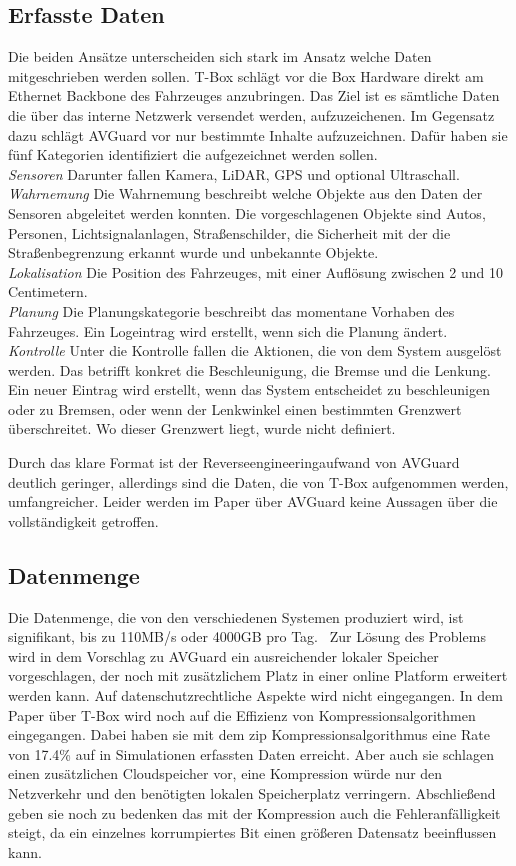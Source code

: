 \documentclass[conference,compsoc,final,a4paper]{IEEEtran}
\begin{document}
\subsection{Erfasste Daten}

Die beiden Ansätze unterscheiden sich stark im Ansatz welche Daten mitgeschrieben werden sollen.
T-Box schlägt vor die Box Hardware direkt am Ethernet Backbone des Fahrzeuges anzubringen.
Das Ziel ist es sämtliche Daten die über das interne Netzwerk versendet werden, aufzuzeichenen.
Im Gegensatz dazu schlägt AVGuard vor nur bestimmte Inhalte aufzuzeichnen.
Dafür haben sie fünf Kategorien identifiziert die aufgezeichnet werden sollen.\\
\emph{Sensoren} Darunter fallen Kamera, \ac{LiDAR}, \ac{GPS} und optional Ultraschall.\\
\emph{Wahrnemung} Die Wahrnemung beschreibt welche Objekte aus den Daten der Sensoren abgeleitet werden konnten.
  Die vorgeschlagenen Objekte sind Autos, Personen, Lichtsignalanlagen, Straßenschilder,
  die Sicherheit mit der die Straßenbegrenzung erkannt wurde und unbekannte Objekte.\\
\emph{Lokalisation} Die Position des Fahrzeuges, mit einer Auflösung zwischen 2 und 10 Centimetern.\\
\emph{Planung} Die Planungskategorie beschreibt das momentane Vorhaben des Fahrzeuges.
  Ein Logeintrag wird erstellt, wenn sich die Planung ändert.\\
\emph{Kontrolle} Unter die Kontrolle fallen die Aktionen, die von dem System ausgelöst werden.
  Das betrifft konkret die Beschleunigung, die Bremse und die Lenkung. 
  Ein neuer Eintrag wird erstellt, wenn das System entscheidet zu beschleunigen oder zu Bremsen,
  oder wenn der Lenkwinkel einen bestimmten Grenzwert überschreitet. Wo dieser Grenzwert liegt, wurde nicht definiert.

Durch das klare Format ist der Reverseengineeringaufwand von AVGuard deutlich geringer, allerdings sind die Daten, die
von T-Box aufgenommen werden, umfangreicher. Leider werden im Paper über AVGuard keine Aussagen über die vollständigkeit getroffen.

\subsection{Datenmenge}
Die Datenmenge, die von den verschiedenen Systemen produziert wird, ist signifikant, bis zu 110MB/s oder 4000GB pro Tag.~\cite{Hoque_2021a}
Zur Lösung des Problems wird in dem Vorschlag zu AVGuard ein ausreichender lokaler Speicher vorgeschlagen, der noch mit
zusätzlichem Platz in einer online Platform erweitert werden kann. Auf datenschutzrechtliche Aspekte wird nicht eingegangen.
In dem Paper über T-Box wird noch auf die Effizienz von Kompressionsalgorithmen eingegangen. Dabei haben sie mit dem zip Kompressionsalgorithmus
eine Rate von 17.4\% auf in Simulationen erfassten Daten erreicht. Aber auch sie schlagen einen zusätzlichen Cloudspeicher vor,
eine Kompression würde nur den Netzverkehr und den benötigten lokalen Speicherplatz verringern.
Abschließend geben sie noch zu bedenken das mit der Kompression auch die Fehleranfälligkeit steigt, da ein einzelnes korrumpiertes Bit
einen größeren Datensatz beeinflussen kann.
\end{document}
